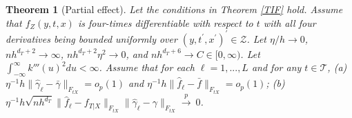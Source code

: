 \documentclass[lettersize, 12pt]{article}
\newtheorem{theorem}{Theorem}
\begin{document}
\begin{theorem}[Partial effect]
Let the conditions in Theorem \ref{TIF} hold.
Assume that $f_{Z}(y,t,x)$ is four-times differentiable with respect to $t$ with all four derivatives being bounded uniformly over $(y,t^\prime,x^\prime)^\prime \in \mathcal{Z}$.
Let $\eta/h \rightarrow 0$, $nh^{d_T + 2} \rightarrow \infty$, $nh^{d_T + 2 }\eta^2 \rightarrow 0$, and $nh^{d_T+6}\rightarrow C\in [0,\infty)$.
Let $\int_{-\infty}^\infty k'''(u)^2 du < \infty$.
Assume that
for each $\ell= 1,...,L$ and for any $t \in \mathcal{T}$,
(a)~$\eta^{-1}h\big\|\hat \gamma_\ell - \bar \gamma \big\|_{F_{tX}} = o_p(1)$ and 
$\eta^{-1}h\big\|\hat f_\ell - \bar f \big\|_{F_{tX}} = o_p(1)$;
(b)~$\eta^{-1}h\sqrt{nh^{d_T}} \big\| \hat f_\ell - f_{T|X} \big\|_{F_{tX}}  \big\| \hat\gamma_\ell - \gamma\big\|_{F_{tX}}  \stackrel{p}{\rightarrow}~0$. 

\end{theorem}
\end{document}
